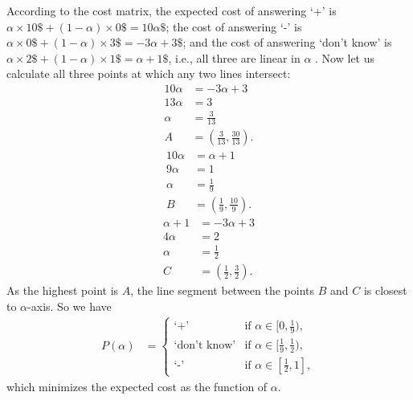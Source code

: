 \documentclass[10pt]{article}
\begin{document}
\color{black}
\noindent According to the cost matrix, the expected cost of answering `+' is $\alpha \times 10\$ + (1 - \alpha) \times 0\$ = 10\alpha\$$; the cost of answering `-' is $\alpha \times 0\$ + (1 - \alpha) \times 3\$ = -3\alpha + 3\$$; and the cost of answering `don't know' is $\alpha \times 2\$ + (1 - \alpha) \times 1\$ = \alpha + 1\$$, i.e., all three are linear in $\alpha$ . Now let us calculate all three points at which any two lines intersect:
\begin{align*}
10\alpha &= -3\alpha + 3 \\
13\alpha &= 3 \\
\alpha &= \frac{3}{13} \\
A &= (\frac{3}{13}, \frac{30}{13}).
\end{align*}
\begin{align*}
10\alpha &= \alpha + 1 \\
9\alpha &= 1 \\
\alpha &= \frac{1}{9} \\
B &= (\frac{1}{9}, \frac{10}{9}).
\end{align*}
\begin{align*}
\alpha + 1 &= -3\alpha + 3 \\
4\alpha &= 2 \\
\alpha &= \frac{1}{2} \\
C &= (\frac{1}{2}, \frac{3}{2}).
\end{align*}
As the highest point is $A$, the line segment between the points $B$ and $C$ is closest to $\alpha$-axis. So we have
\begin{align*}
P(\alpha) &= 
\begin{cases}
\text{`+'}                & \mbox{if } \alpha \in [0, \frac{1}{9}), \\
\text{`don't know'}  & \mbox{if } \alpha \in [\frac{1}{9}, \frac{1}{2}), \\
\text{`-'}                 & \mbox{if } \alpha \in [\frac{1}{2}, 1],
\end{cases}
\end{align*}
which minimizes the expected cost as the function of $\alpha$.

\color{blue}
\end{document}

